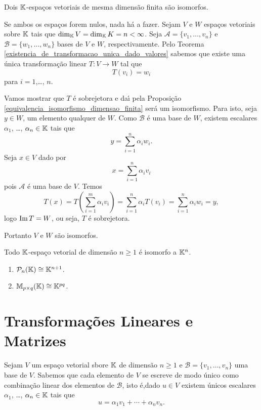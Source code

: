 \begin{teorema}\label{teorema_espacos_isomorfos}
	Dois $\mathbb{K}$-espa\c{c}os vetoriais de mesma dimens\~ao finita s\~ao isomorfos.
\end{teorema}
\begin{prova}
	Se ambos os espa\c{c}os forem nulos, nada h\'a a fazer. Sejam $V$ e $W$ espa\c{c}os vetoriais sobre $\mathbb{K}$ tais que $\dim_{\mathbb{K}}V = \dim_{\mathbb{K}}K = n < \infty$. Seja $\mathcal{A} = \{v_1,\dots,v_n\}$ e $\mathcal{B} = \{w_1,\dots,w_n\}$ bases de $V$ e $W$, respectivamente. Pelo Teorema \ref{existencia_de_transformacao_unica_dado_valores} sabemos que existe uma \'unica transforma\c{c}\~ao linear $T : V \to W$ tal que
	\[
		T(v_i) = w_i
	\]
	para $i=1$,\dots, $n$.

	Vamos mostrar que $T$ \'e sobrejetora e da{\'\i} pela Proposi\c{c}\~ao \ref{equivalencia_isomorfismo_dimensao_finita} ser\'a um isomorfismo. Para isto, seja $y \in W$, um elemento qualquer de $W$. Como $\mathcal{B}$ \'e uma base de $W$, existem escalares $\alpha_1$, \dots, $\alpha_n \in \mathbb{K}$ tais que
	\[
		y = \sum_{i=1}^n\alpha_iw_i.
	\]
	Seja $x \in V$ dado por
	\[
		x = \sum_{i=1}^n\alpha_iv_i
	\]
	pois $\mathcal{A}$ \'e uma base de $V$. Temos
	\[
		T(x) = T(\sum_{i=1}^m\alpha_iv_i) = \sum_{i=1}^n\alpha_iT(v_i) = \sum_{i=1}^n\alpha_iw_i = y,
	\]
	logo ${\rm Im\,} T = W$, ou seja, $T$ \'e sobrejetora.

	Portanto $V$ e $W$ s\~ao isomorfos.
\end{prova}

\begin{corolario}
	Todo $\mathbb{K}$-espa\c{c}o vetorial de dimens\~ao $n \ge 1$ \'e isomorfo a $\mathbb{K}^n$.
\end{corolario}

\begin{exemplos}
	\begin{enumerate}
		\item $\mathcal{P}_n(\mathbb{K}) \cong \mathbb{K}^{n+1}$.
		\item $\mathbb{M}_{p\times q}(\mathbb{K}) \cong \mathbb{K}^{pq}$.
	\end{enumerate}
\end{exemplos}

\section{Transforma\c{c}\~oes Lineares e Matrizes} %
\label{sec:transformacoes_lineares_e_matrizes}

Sejam $V$ um espa\c{c}o vetorial sbore $\mathbb{K}$ de dimens\~ao $n \ge 1$ e $\mathcal{B} = \{v_1,\dots,v_n\}$ uma base de $V$. Sabemos que cada elemento de $V$ se escreve de modo \'unico como combina\c{c}\~ao linear dos elementos de $\mathcal{B}$, isto \'e,dado $u \in V$ existem \'unicos escalares $\alpha_1$, \dots, $\alpha_n \in \mathbb{K}$ tais que
\[
	u = \alpha_1v_1 + \cdots + \alpha_nv_n.
\]

